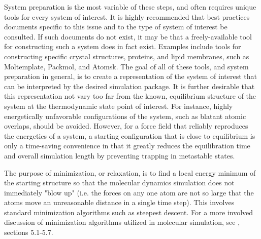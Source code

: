 \documentclass[9pt,bestpractices]{livecoms}
\begin{document}
System preparation is the most variable of these steps, and often requires unique tools for every system of interest.
It is highly recommended that best practices documents specific to this issue and to the type of system of interest be consulted.
If such documents do not exist, it may be that a freely-available tool for constructing such a system does in fact exist.
Examples include tools for constructing specific crystal structures, proteins, and lipid membranes, such as Moltemplate, Packmol, and Atomsk.
The goal of all of these tools, and system preparation in general, is to create a representation of the system of interest that can be interpreted by the desired simulation package.
It is further desirable that this representation not vary too far from the known, equilibrium structure of the system at the thermodynamic state point of interest.
For instance, highly energetically unfavorable configurations of the system, such as blatant atomic overlaps, should be avoided.
However, for a force field that reliably reproduces the energetics of a system, a starting configuration that is close to equilibrium is only a time-saving convenience in that it greatly reduces the equilibration time and overall simulation length by preventing trapping in metastable states.

The purpose of minimization, or relaxation, is to find a local energy minimum of the starting structure so that the molecular dynamics simulation does not immediately "blow up" (i.e. the forces on any one atom are not so large that the atoms move an unreasonable distance in a single time step).
This involves standard minimization algorithms such as steepest descent.
For a more involved discussion of minimization algorithms utilized in molecular simulation, see \citet{2001Leach}, sections 5.1-5.7.
\end{document}
